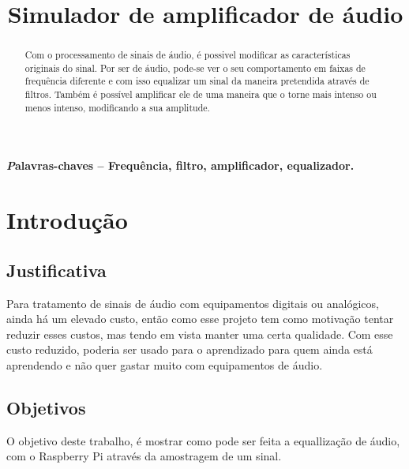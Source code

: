 \documentclass[conference]{IEEEtran}
\begin{document}
\title{Simulador de amplificador de áudio}
\author{
\and
{}
}%

\maketitle


\begin{abstract}
Com o processamento de sinais de áudio, é possivel modificar as características originais do sinal. Por ser de áudio, pode-se ver o seu comportamento em faixas de frequência diferente e com isso equalizar um sinal da maneira pretendida através de filtros. Também é possível amplificar ele de uma maneira que o torne mais intenso ou menos intenso, modificando a sua amplitude.
\end{abstract}


{\small \textbf{{\textit Palavras-chaves} -- Frequência, filtro, amplificador, equalizador.}}


\IEEEpeerreviewmaketitle



\section{Introdução}
 
\subsection{Justificativa}
Para tratamento de sinais de áudio com equipamentos digitais ou analógicos, ainda há um elevado custo, então como esse projeto tem como motivação tentar reduzir esses custos, mas tendo em vista manter uma certa qualidade. Com esse custo reduzido, poderia ser usado para o aprendizado para quem ainda está aprendendo e não quer gastar muito com equipamentos de áudio. 

\subsection{Objetivos}
O objetivo deste trabalho, é mostrar como pode ser feita a equallização de áudio, com o Raspberry Pi através da amostragem de um sinal. 
\end{document}
